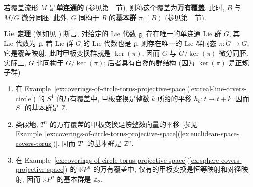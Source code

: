 若覆盖流形 $M$ 是\textbf{单连通的} (参见第~~节), 则称这个覆盖为\textbf{万有覆盖}. 此时, $B$ 与 $M/G$ 微分同胚. 此外, $G$ 同构于 $B$ 的\textbf{基本群} $\pi_1(B)$ (参见第~~节).

\textbf{Lie 定理} (例如见 ) 断言, 对给定的 Lie 代数 $\mathfrak g$, 存在唯一的单连通 Lie 群 $\widetilde G$, 其 Lie 代数为 $\mathfrak g$. 若 Lie 群 $G$ 的 Lie 代数也是 $\mathfrak g$, 则存在唯一的 Lie 群同态 $\pi:\widetilde G\to G$, 它是覆盖映射. 此时甲板变换群就是 $\ker(\pi)$, 因而 $G$ 与 $\widetilde G/\ker(\pi)$ 微分同胚. 实际上, $G$ 也同构于 $\widetilde G/\ker(\pi)$; 后者具有自然的群结构 (因为 $\ker(\pi)$ 是正规子群).

\begin{RiemannExample}\label{ex:fundamental-groups-from-universal-coverings}
\begin{enumerate}[label=(\arabic*),leftmargin=*]
\item 在 Example~\ref{ex:coverings-of-circle-torus-projective-space}(\ref{ex:real-line-covers-circle}) 的 $S^1$ 的万有覆盖中, 甲板变换是整数 $k$ 所给的平移 $h_k:t\mapsto t+k$, 因而 $S^1$ 的基本群是 $\mathbb{Z}$.
\item 类似地, $T^n$ 的万有覆盖的甲板变换是按整数向量的平移 [参见 Example~\ref{ex:coverings-of-circle-torus-projective-space}(\ref{ex:euclidean-space-covers-torus})], 因而 $T^n$ 的基本群是 $\mathbb{Z}^n$.
\item 在 Example~\ref{ex:coverings-of-circle-torus-projective-space}(\ref{ex:sphere-covers-projective-space}) 的 $\mathbb{R}P^n$ 的万有覆盖中, 仅有的甲板变换是恒等映射和对径映射, 因而 $\mathbb{R}P^n$ 的基本群是 $\mathbb{Z}_2$.
\end{enumerate}
\end{RiemannExample}
